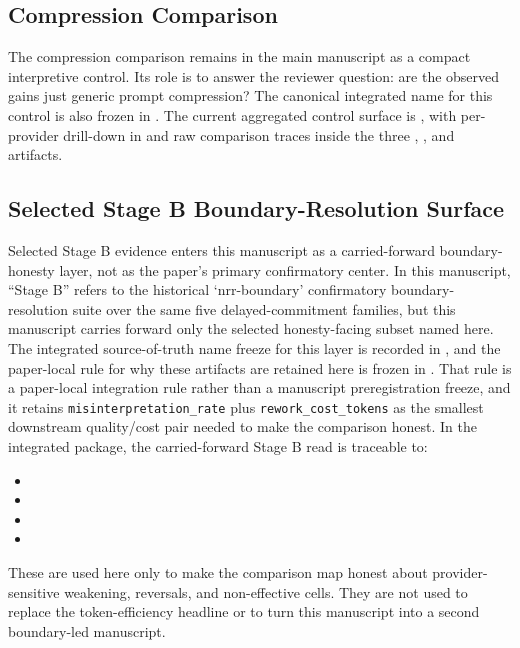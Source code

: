 \documentclass[11pt,a4paper]{article}
\begin{document}
\subsection{Compression Comparison}

The compression comparison remains in the main manuscript as a compact interpretive control. Its role is to answer the reviewer question: are the observed gains just generic prompt compression? The canonical integrated name for this control is also frozen in . The current aggregated control surface is , with per-provider drill-down in  and raw comparison traces inside the three , , and  artifacts.

\subsection{Selected Stage B Boundary-Resolution Surface}

Selected Stage B evidence enters this manuscript as a carried-forward boundary-honesty layer, not as the paper's primary confirmatory center. In this manuscript, ``Stage B'' refers to the historical `nrr-boundary' confirmatory boundary-resolution suite over the same five delayed-commitment families, but this manuscript carries forward only the selected honesty-facing subset named here. The integrated source-of-truth name freeze for this layer is recorded in , and the paper-local rule for why these artifacts are retained here is frozen in . That rule is a paper-local integration rule rather than a manuscript preregistration freeze, and it retains \texttt{misinterpretation\_rate} plus \texttt{rework\_cost\_tokens} as the smallest downstream quality/cost pair needed to make the comparison honest. In the integrated package, the carried-forward Stage B read is traceable to:
\begin{itemize}
  \item {}
  \item {}
  \item {}
  \item {}
\end{itemize}
These are used here only to make the comparison map honest about provider-sensitive weakening, reversals, and non-effective cells. They are not used to replace the token-efficiency headline or to turn this manuscript into a second boundary-led manuscript.
\end{document}
